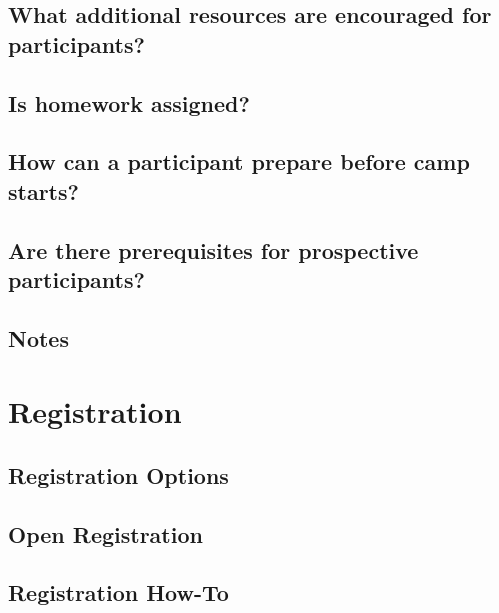 \documentclass[letterpaper,10pt,english]{sphinxmanual}
\begin{document}
\section{What additional resources are encouraged for participants?}
\label{faq:what-additional-resources-are-encouraged-for-participants}

\section{Is homework assigned?}
\label{faq:is-homework-assigned}

\section{How can a participant prepare before camp starts?}
\label{faq:how-can-a-participant-prepare-before-camp-starts}

\section{Are there prerequisites for prospective participants?}
\label{faq:are-there-prerequisites-for-prospective-participants}

\section{Notes}
\label{faq:notes}

\chapter{Registration}
\label{registration::doc}\label{registration:index-0}\label{registration:registration}

\section{Registration Options}
\label{registration:registration-options}

\section{Open Registration}
\label{registration:open-registration}

\section{Registration How-To}
\label{registration:registration-how-to}


\renewcommand{\indexname}{Index}
\printindex
\end{document}
